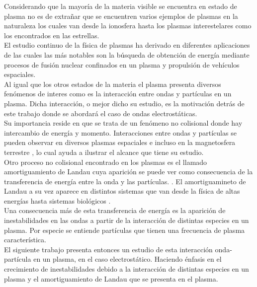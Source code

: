 \documentclass[../tesis_main_file.tex]{subfiles}
\begin{document}

Considerando que la mayoría de la materia visible se encuentra en estado de plasma \cite{bittencourt2013fundamentals} no es de extrañar que se encuentren varios ejemplos de plasmas en la naturaleza los cuales van desde la ionosfera hasta los plasmas interestelares como los encontrados en las estrellas.\\
El estudio continuo de la física de plasmas ha derivado en diferentes aplicaciones de las cuales las más notables son la búsqueda de obtención de energía mediante procesos de fusión nuclear confinados en un plasma y propulsión de vehículos espaciales.\\
Al igual que los otros estados de la materia el plasma presenta diversos fenómenos de interes como es la interacción entre ondas y partículas en un plasma. 
Dicha interacción, o mejor dicho su estudio, es la motivación detrás de este trabajo donde se abordará el caso de ondas electrostáticas.\\
Su importancia reside en que se trata de un fenómeno no colisional donde hay intercambio de energía y momento. 
Interacciones entre ondas y partículas se pueden observar en diversos plasmas espaciales e incluso en la magnetosfera terrestre \cite{kitamura2018direct},
lo cual ayuda a ilustrar el alcance que tiene su estudio.\\
Otro proceso no colisional encontrado en los plasmas es el llamado amortiguamiento de Landau cuya aparición se puede ver como consecuencia de la transferencia de energía entre la onda y las partículas. \cite{bellan2008fundamentals}.
El amortiguamineto de Landau a su vez aparece en distintos sistemas que van desde la física de altas energías hasta sistemas biológicos \cite{sagan1994physics}.\\
Una consecuencia más de esta transferencia de energía es la aparición de inestabilidades en las ondas a partir de la interacción de distintas especies en un plasma. Por especie se entiende partículas que tienen una frecuencia de plasma característica.\\
El siguiente trabajo presenta entonces un estudio de esta interacción onda-partícula en un plasma, en el caso electrostático. Haciendo énfasis en el crecimiento de inestabilidades debido a la interacción de distintas especies en un plasma y el amortiguamiento de Landau que se presenta en el plasma.\\
\end{document}
